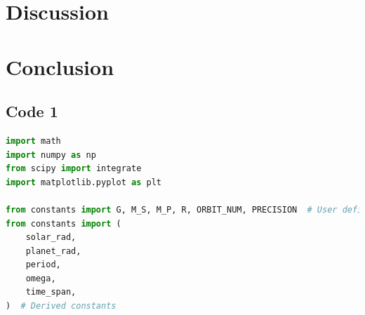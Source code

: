 \documentclass[11pt, a4paper,twocolumn]{article} %
\begin{document}
\section{Discussion}
\section{Conclusion}



\printbibliography

\onecolumn
\begin{appendices}

\section{Code 1} \label{Code}
\begin{lstlisting}[language=Python]
import math
import numpy as np
from scipy import integrate
import matplotlib.pyplot as plt

from constants import G, M_S, M_P, R, ORBIT_NUM, PRECISION  # User defined constants
from constants import (
	solar_rad,
	planet_rad,
	period,
	omega,
	time_span,
)  # Derived constants


\end{lstlisting}

\end{appendices}
\end{document}
